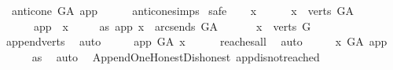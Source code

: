 \begin{isabellebody}
\ \ {\isachardoublequoteopen}anticone\ G{\isacharunderscore}{\kern0pt}A\ app\ {\isacharequal}{\kern0pt}\ {\isacharbraceleft}{\kern0pt}{\isacharbraceright}{\kern0pt}{\isachardoublequoteclose}\isanewline
%
\isadelimproof
\ \ %
\endisadelimproof
%
\isatagproof
{}\isamarkupfalse%
\ anticone{\isachardot}{\kern0pt}simps\isanewline
{}\isamarkupfalse%
\ safe\isanewline
\ \ \isamarkupfalse%
\ x\ \isanewline
\ \ \isamarkupfalse%
\ \ {\isachardoublequoteopen}x\ {\isasymin}\ verts\ G{\isacharunderscore}{\kern0pt}A{\isachardoublequoteclose}\isanewline
\ \ \ \ \ \ {\isachardoublequoteopen}app\ {\isasymnoteq}\ x{\isachardoublequoteclose}\isanewline
\ \ \ \ \ as{\isacharcolon}{\kern0pt}\ {\isachardoublequoteopen}{\isacharparenleft}{\kern0pt}app{\isacharcomma}{\kern0pt}\ x{\isacharparenright}{\kern0pt}\ {\isasymnotin}\ {\isacharparenleft}{\kern0pt}arcs{\isacharunderscore}{\kern0pt}ends\ G{\isacharunderscore}{\kern0pt}A{\isacharparenright}{\kern0pt}\isactrlsup {\isacharplus}{\kern0pt}\ {\isachardoublequoteclose}\isanewline
\ \ \isamarkupfalse%
\ \isamarkupfalse%
\ {\isachardoublequoteopen}x\ {\isasymin}\ verts\ G{\isachardoublequoteclose}\ \isanewline
\ \ \ \ \isamarkupfalse%
\ append{\isacharunderscore}{\kern0pt}verts\ \isamarkupfalse%
\ auto\isanewline
\ \ \isamarkupfalse%
\ \isamarkupfalse%
\ {\isachardoublequoteopen}app\ {\isasymrightarrow}\isactrlsup {\isacharplus}{\kern0pt}\isactrlbsub G{\isacharunderscore}{\kern0pt}A\isactrlesub \ x{\isachardoublequoteclose}\isanewline
\ \ \ \ \isamarkupfalse%
\ reaches{\isacharunderscore}{\kern0pt}all\ \isamarkupfalse%
\ auto\isanewline
\ \ \isamarkupfalse%
\ \isamarkupfalse%
\ {\isachardoublequoteopen}x\ {\isasymrightarrow}\isactrlsup {\isacharplus}{\kern0pt}\isactrlbsub G{\isacharunderscore}{\kern0pt}A\isactrlesub \ app{\isachardoublequoteclose}\ \isanewline
\ \ \ \ \isamarkupfalse%
\ as\ \isamarkupfalse%
\ auto\isanewline
{}\isamarkupfalse%
%
\endisatagproof
{\isafoldproof}%
%
\isadelimproof
%
\endisadelimproof
%
\isadelimdocument
%
\endisadelimdocument
%
\isatagdocument
%
\isamarkuptrue%
%
\endisatagdocument
{\isafolddocument}%
%
\isadelimdocument
%
\endisadelimdocument
{}\isamarkupfalse%
\ {\isacharparenleft}{\kern0pt}\ Append{\isacharunderscore}{\kern0pt}One{\isacharunderscore}{\kern0pt}Honest{\isacharunderscore}{\kern0pt}Dishonest{\isacharparenright}{\kern0pt}\ app{\isacharunderscore}{\kern0pt}dis{\isacharunderscore}{\kern0pt}not{\isacharunderscore}{\kern0pt}reached{\isacharcolon}{\kern0pt}\isanewline

\end{isabellebody}
